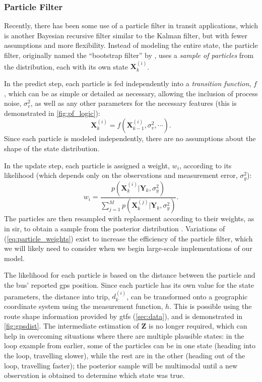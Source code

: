 \documentclass[12pt,a4paper]{article}
\newcommand{\bY}{\mathbf{Y}}
\newcommand{\bX}{\mathbf{X}}
\newcommand{\mat}[1]{\mathbf{#1}}
\newcommand{\kf}{Kalman filter}
\newcommand{\pf}{particle filter}
\begin{document}
\subsubsection{Particle Filter}
\label{sec:particle-filter}

Recently, there has been some use of a \pf{} in transit applications,
which is another Bayesian recursive filter similar to the \kf{},
but with fewer assumptions and more flexibility.
Instead of modeling the entire state,
the \pf{}, originally named the ``bootstrap filter'' by  \cite{gordon-etal:1993},
uses a \emph{sample of particles} from the distribution,
each with its own state $\bX_k^{(i)}$.


In the predict step,
each particle is fed independently into a \emph{transition function}, $f$,
which can be as simple or detailed as necessary,
allowing the inclusion of process noise, $\sigma_v^2$,
as well as any other parameters for the necessary features 
(this is demonstrated in \cref{fig:pf_logic}):
\begin{equation}
  \label{eq:particle_transition}
  \bX_k^{(i)} = f(\bX_{k-1}^{(i)}, \sigma_v^2, \cdots).
\end{equation}
Since each particle is modeled independently,
there are no assumptions about the shape of the state distribution.


In the update step, each particle is assigned a weight, $w_i$, according to its likelihood
(which depends only on the observations and measurement error, $\sigma_y^2$):
\begin{equation}
  \label{eq:particle_weights}
  w_i = \frac{p(\bX_k^{(i)} | \bY_k, \sigma_y^2)}{\sum_{j=1}^M p(\bX_k^{(j)} | \bY_k, \sigma_y^2)}.
\end{equation}
The particles are then resampled with replacement according to their weights,
as in \gls{sir},
to obtain a sample from the posterior distribution \citep{gordon-etal:1993}.
Variations of (\ref{eq:particle_weights}) exist to increase the efficiency of the \pf{},
which we will likely need to consider when we begin
large-scale implementations of our model.


The likelihood for each particle is based on the distance between the particle
and the bus' reported \gls{gps} position.
Since each particle has its own value for the state parameters,
the distance into trip, $d_k^{(i)}$, can be transformed onto a geographic coordinate system
using the measurement function, $h$.
This is possible using the route shape information provided by \gls{gtfs} (\cref{sec:data}),
and is demonstrated in \cref{fig:gpsdist}.
The intermediate estimation of $\mat{Z}$ is no longer required,
which can help in overcoming situations where there are multiple plausible states:
in the loop example from earlier, some of the particles can be in one state
(heading into the loop, travelling slower), 
while the rest are in the other (heading out of the loop, travelling faster);
the posterior sample will be multimodal until a new observation is obtained to 
determine which state was true.
\end{document}
